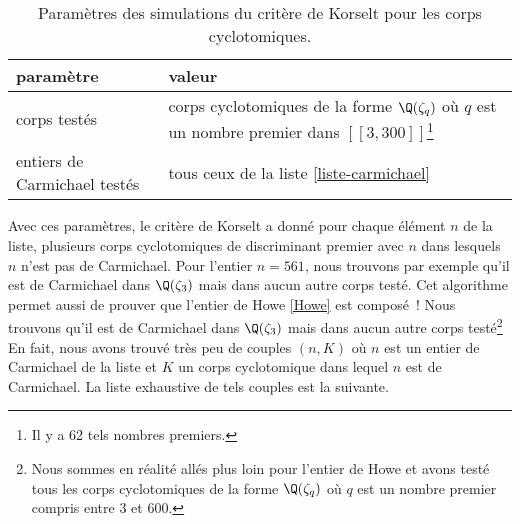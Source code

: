 \begin{table}[H]\label{param-korselt-cyclo}
	\begin{center}
		\begin{tabularx}{\textwidth}{|Y|Y|}
			\hline
			paramètre & valeur \\
			\hline
			\hline
			corps testés & corps cyclotomiques de la forme $\Q(\zeta_q)$ où $q$ est un nombre premier dans $[\![3, 300]\!]$\footnote{Il y a 62 tels nombres premiers.} \\\hline
			entiers de Carmichael testés & tous ceux de la liste \ref{liste-carmichael} \\\hline
		\end{tabularx}
		\caption{Paramètres des simulations du critère de Korselt pour les corps cyclotomiques.}
	\end{center}
\end{table}

Avec ces paramètres, le critère de Korselt a donné pour chaque élément $n$ de la liste, plusieurs corps cyclotomiques de discriminant premier avec $n$ dans lesquels $n$ n'est pas de Carmichael. Pour l'entier $n = 561$, nous trouvons par exemple qu'il est de Carmichael dans $\Q(\zeta_3)$ mais dans aucun autre corps testé. Cet algorithme permet aussi de prouver que l'entier de Howe \ref{Howe} est composé~! Nous trouvons qu'il est de Carmichael dans $\Q(\zeta_3)$ mais dans aucun autre corps testé\footnote{Nous sommes en réalité allés plus loin pour l'entier de Howe et avons testé tous les corps cyclotomiques de la forme $\Q(\zeta_q)$ où $q$ est un nombre premier compris entre $3$ et $600$.} En fait, nous avons trouvé très peu de couples $(n, K)$ où $n$ est un entier de Carmichael de la liste et $K$ un corps cyclotomique dans lequel $n$ est de Carmichael. La liste exhaustive de tels couples est la suivante.

